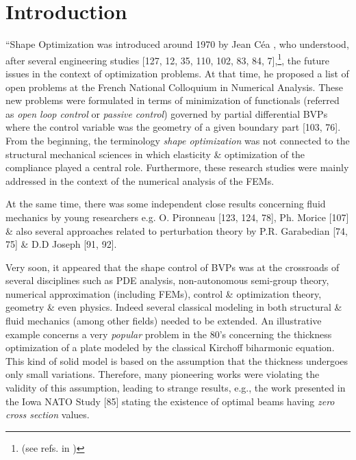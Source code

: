 \documentclass[oneside]{book}
\numberwithin{equation}{section}
\begin{document}
\section{Introduction}
``Shape Optimization was introduced around 1970 by Jean C\'ea \cite{Cea_Gioan_Michel1973}, who understood, after several engineering studies [127, 12, 35, 110, 102, 83, 84, 7],\footnote{(see refs. in \cite{Moubachir_Zolesio2006})}, the future issues in the context of optimization problems. At that time, he proposed a list of open problems at the French National Colloquium in Numerical Analysis. These new problems were formulated in terms of minimization of functionals (referred as \textit{open loop control} or \textit{passive control}) governed by partial differential BVPs where the control variable was the geometry of a given boundary part [103, 76]. From the beginning, the terminology \textit{shape optimization} was not connected to the structural mechanical sciences in which elasticity \& optimization of the compliance played a central role. Furthermore, these research studies were mainly addressed in the context of the numerical analysis of the FEMs.

At the same time, there was some independent close results concerning fluid mechanics by young researchers e.g. O. Pironneau [123, 124, 78], Ph. Morice [107] \& also several approaches related to perturbation theory by P.R. Garabedian [74, 75] \& D.D Joseph [91, 92].

Very soon, it appeared that the shape control of BVPs was at the crossroads of several disciplines such as PDE analysis, non-autonomous semi-group theory, numerical approximation (including FEMs), control \& optimization theory, geometry \& even physics. Indeed several classical modeling in both structural \& fluid mechanics (among other fields) needed to be extended. An illustrative example concerns a very \textit{popular} problem in the 80's concerning the thickness optimization of a plate modeled by the classical Kirchoff biharmonic equation. This kind of solid model is based on the assumption that the thickness undergoes only small variations. Therefore, many pioneering works were violating the validity of this assumption, leading to strange results, e.g., the work presented in the Iowa NATO Study [85] stating the existence of optimal beams having \textit{zero cross section} values.
\end{document}
